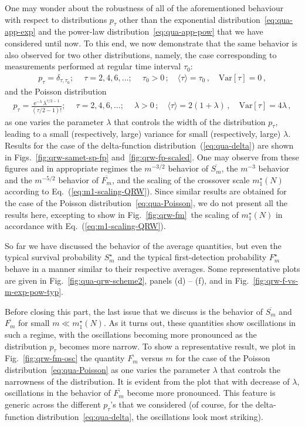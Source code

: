 \documentclass[12pt]{iopart}
\newcommand{\ee}{\mathrm{e}}
\begin{document}
One may wonder about the robustness of all of the aforementioned behaviour with respect to distributions $p_\tau$ other than the exponential distribution~\eqref{eq:qua-app-exp} and the power-law distribution~\eqref{eq:qua-app-pow} that we have considered until now. To this end, we now demonstrate that the same behavior is also observed for two other distributions, namely,  the case corresponding to measurements performed at regular time interval $\tau_0$:
\begin{align}
p_\tau=\delta_{\tau,\tau_0};~\quad \tau=2,4,6,\ldots;~\quad \tau_0>0\, ; \quad \langle \tau \rangle = \tau_0 \, , \quad {\mathrm{Var}}[\tau] = 0 \, ,
\label{eq:qua-delta}
\end{align}
and the Poisson distribution
\begin{align}
p_\tau =    \frac{  \ee^{-\lambda} \, \lambda^{\tau/2-1} }{(\tau/2-1)!} ;~\quad \tau=2,4,6,\ldots;~\quad \lambda > 0\, ; \quad \langle \tau \rangle = 2 (1+\lambda) \, , \quad {\mathrm{Var}}[\tau] = 4 \lambda \, ,
\label{eq:qua-Poisson}
\end{align}
as one varies the parameter $\lambda$ that controls the width of the distribution $p_\tau$, leading to a small (respectively, large) variance for small (respectively, large) $\lambda$.  Results for the case of the delta-function distribution~(\ref{eq:qua-delta}) are shown in Figs.~\ref{fig:qrw-samet-sp-fp} and~\ref{fig:qrw-fp-scaled}.  One may observe from these figures and in appropriate regimes the $m^{-3/2}$ behavior of $\overline{S_m}$, the $m^{-3}$ behavior and the $m^{-5/2}$ behavior of $\overline{F_m}$,  and the scaling of the crossover scale $m_1^\star(N)$ according to Eq.~(\ref{eq:m1-scaling-QRW}).  Since similar results are obtained for the case of the Poisson distribution~\eqref{eq:qua-Poisson},  we do not present all the results here, excepting to show in Fig.~\ref{fig:qrw-fm}\, the scaling of $m_1^\star(N)$ in accordance with Eq.~(\ref{eq:m1-scaling-QRW}).
 
So far we have discussed the behavior of the average quantities, but even the typical survival probability $S^{\star}_m$ and the typical first-detection probability $F^{\star}_m$ behave in a manner similar to their respective averages.  Some representative plots are given in Fig.~\ref{fig:qua-qrw-scheme2},  panels (d) -- (f), and in Fig.~\ref{fig:qrw-f-vs-m-exp-pow-typ}.

Before closing this part, the last issue that we discuss is the behavior of $\overline{S_m}$ and $\overline{F_m}$ for small $m \ll m_1^\star(N)$.  As it turns out, these quantities show oscillations in such a regime, with the oscillations becoming more pronounced as the distribution $p_\tau$ becomes more narrow.  To show a representative result,  we plot in Fig.~\ref{fig:qrw-fm-osc} the quantity $\overline{F_m}$ versus $m$ for the case of the Poisson distribution~\eqref{eq:qua-Poisson} as one varies the parameter $\lambda$ that controls the narrowness of the distribution. It is evident from the plot that with decrease of $\lambda$,  oscillations in the behavior of $\overline{F_m}$ become more pronounced. This feature is generic across the different $p_\tau$'s that we considered (of course, for the delta-function distribution~\eqref{eq:qua-delta}, the oscillations look most striking).
\end{document}
